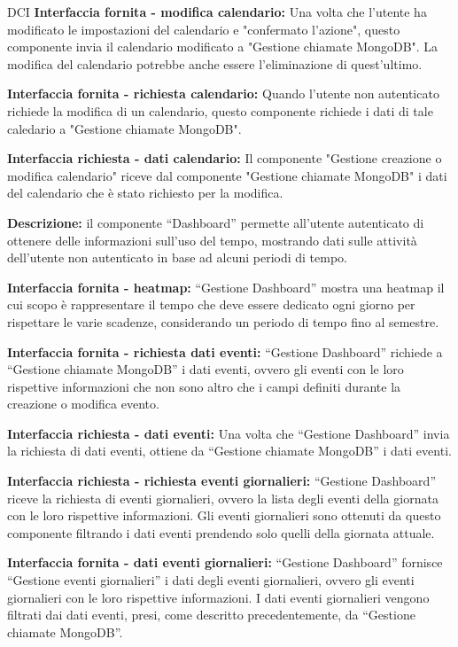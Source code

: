 \begin{listaPersonale}{DCI}
    \textbf{Interfaccia fornita - modifica calendario: } Una volta che l'utente ha modificato le impostazioni del calendario e "confermato l'azione", questo componente invia il calendario modificato a "Gestione chiamate MongoDB". La modifica del calendario potrebbe anche essere l'eliminazione di quest'ultimo.

    \textbf{Interfaccia fornita - richiesta calendario: } Quando l'utente non autenticato richiede la modifica di un calendario, questo componente richiede i dati di tale caledario a "Gestione chiamate MongoDB".

    \textbf{Interfaccia richiesta - dati calendario: } Il componente "Gestione creazione o modifica calendario" riceve dal componente "Gestione chiamate MongoDB" i dati del calendario che è stato richiesto per la modifica.



    \textbf{Descrizione:} il componente “Dashboard” permette all'utente autenticato di ottenere delle informazioni sull'uso del tempo,  mostrando dati sulle attività dell'utente non autenticato in base ad alcuni periodi di tempo.

    \textbf{Interfaccia fornita - heatmap:}  “Gestione Dashboard” mostra una heatmap il cui scopo è rappresentare il tempo che deve essere dedicato ogni giorno per rispettare le varie scadenze, considerando un periodo di tempo fino al semestre.

    \textbf{Interfaccia fornita - richiesta dati eventi:} “Gestione Dashboard” richiede a “Gestione chiamate MongoDB” i dati eventi, ovvero gli eventi con le loro rispettive informazioni che non sono altro che i campi definiti durante la creazione o modifica evento.

    \textbf{Interfaccia richiesta - dati eventi:} Una volta che “Gestione Dashboard” invia la richiesta di dati eventi, ottiene da “Gestione chiamate MongoDB” i dati eventi.

    \textbf{Interfaccia richiesta - richiesta eventi giornalieri:} “Gestione Dashboard” riceve la richiesta di eventi giornalieri, ovvero la lista degli eventi della giornata con le loro rispettive informazioni.
    Gli eventi giornalieri sono ottenuti da questo componente filtrando i dati eventi prendendo solo quelli della giornata attuale.

    \textbf{Interfaccia fornita - dati eventi giornalieri:} “Gestione Dashboard” fornisce “Gestione eventi giornalieri” i dati degli eventi giornalieri, ovvero gli eventi giornalieri con le loro rispettive informazioni. I dati eventi giornalieri vengono filtrati dai dati eventi, presi, come descritto precedentemente, da “Gestione chiamate MongoDB”.


\end{listaPersonale}
